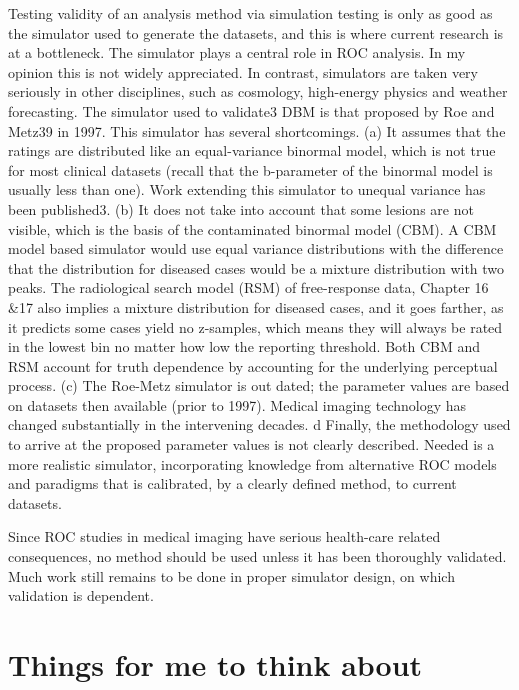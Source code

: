 \documentclass[
]{book}
\begin{document}
Testing validity of an analysis method via simulation testing is only as good as the simulator used to generate the datasets, and this is where current research is at a bottleneck. The simulator plays a central role in ROC analysis. In my opinion this is not widely appreciated. In contrast, simulators are taken very seriously in other disciplines, such as cosmology, high-energy physics and weather forecasting. The simulator used to validate3 DBM is that proposed by Roe and Metz39 in 1997. This simulator has several shortcomings. (a) It assumes that the ratings are distributed like an equal-variance binormal model, which is not true for most clinical datasets (recall that the b-parameter of the binormal model is usually less than one). Work extending this simulator to unequal variance has been published3. (b) It does not take into account that some lesions are not visible, which is the basis of the contaminated binormal model (CBM). A CBM model based simulator would use equal variance distributions with the difference that the distribution for diseased cases would be a mixture distribution with two peaks. The radiological search model (RSM) of free-response data, Chapter 16 \&17 also implies a mixture distribution for diseased cases, and it goes farther, as it predicts some cases yield no z-samples, which means they will always be rated in the lowest bin no matter how low the reporting threshold. Both CBM and RSM account for truth dependence by accounting for the underlying perceptual process. (c) The Roe-Metz simulator is out dated; the parameter values are based on datasets then available (prior to 1997). Medical imaging technology has changed substantially in the intervening decades. d Finally, the methodology used to arrive at the proposed parameter values is not clearly described. Needed is a more realistic simulator, incorporating knowledge from alternative ROC models and paradigms that is calibrated, by a clearly defined method, to current datasets.

Since ROC studies in medical imaging have serious health-care related consequences, no method should be used unless it has been thoroughly validated. Much work still remains to be done in proper simulator design, on which validation is dependent.

\hypertarget{things-for-me-to-think-about}{%
\section{Things for me to think about}\label{things-for-me-to-think-about}}
\end{document}
